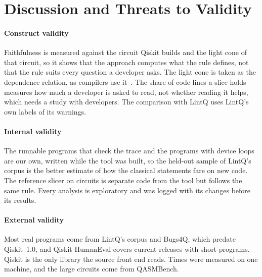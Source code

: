 \section{Discussion and Threats to Validity}\label{sec:b-threats}

\paragraph*{Construct validity}
Faithfulness is measured against the circuit Qiskit builds and the light cone of that circuit, so it shows that the
approach computes what the rule defines, not that the rule suits every question a developer asks. The light cone is
taken as the dependence relation, as compilers use it~\cite{murali2019triq, amy2020staq}. The share of code lines a
slice holds measures how much a developer is asked to read, not whether reading it helps, which needs a study with
developers. The comparison with LintQ uses LintQ's own labels of its warnings.

\paragraph*{Internal validity}
The runnable programs that check the trace and the programs with device loops are our own, written while the tool was
built, so the held-out sample of LintQ's corpus is the better estimate of how the classical statements fare on new code.
The reference slicer on circuits is separate code from the tool but follows the same rule. Every analysis is
exploratory and was logged with its changes before its results.

\paragraph*{External validity}
Most real programs come from LintQ's corpus and Bugs4Q, which predate Qiskit~1.0, and Qiskit HumanEval covers current
releases with short programs. Qiskit is the only library the source front end reads. Times were measured on one
machine, and the large circuits come from QASMBench.
